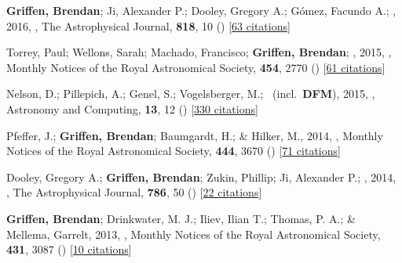 \item[{\color{numcolor}\scriptsize8}] \textbf{Griffen, Brendan}; Ji, Alexander P.; Dooley, Gregory A.; G{\'o}mez, Facundo A.; \etal, 2016, , The Astrophysical Journal, \textbf{818}, 10 () [\href{https://ui.adsabs.harvard.edu/abs/2016ApJ...818...10G}{63 citations}]

\item[{\color{numcolor}\scriptsize7}] Torrey, Paul; Wellons, Sarah; Machado, Francisco; \textbf{Griffen, Brendan}; \etal, 2015, , Monthly Notices of the Royal Astronomical Society, \textbf{454}, 2770 () [\href{https://ui.adsabs.harvard.edu/abs/2015MNRAS.454.2770T}{61 citations}]

\item[{\color{numcolor}\scriptsize6}] Nelson, D.; Pillepich, A.; Genel, S.; Vogelsberger, M.; \etal\ (incl.\ \textbf{DFM}), 2015, , Astronomy and Computing, \textbf{13}, 12 () [\href{https://ui.adsabs.harvard.edu/abs/2015A&C....13...12N}{330 citations}]

\item[{\color{numcolor}\scriptsize5}] Pfeffer, J.; \textbf{Griffen, Brendan}; Baumgardt, H.; \& Hilker, M., 2014, , Monthly Notices of the Royal Astronomical Society, \textbf{444}, 3670 () [\href{https://ui.adsabs.harvard.edu/abs/2014MNRAS.444.3670P}{71 citations}]

\item[{\color{numcolor}\scriptsize4}] Dooley, Gregory A.; \textbf{Griffen, Brendan}; Zukin, Phillip; Ji, Alexander P.; \etal, 2014, , The Astrophysical Journal, \textbf{786}, 50 () [\href{https://ui.adsabs.harvard.edu/abs/2014ApJ...786...50D}{22 citations}]

\item[{\color{numcolor}\scriptsize3}] \textbf{Griffen, Brendan}; Drinkwater, M. J.; Iliev, Ilian T.; Thomas, P. A.; \& Mellema, Garrelt, 2013, , Monthly Notices of the Royal Astronomical Society, \textbf{431}, 3087 () [\href{https://ui.adsabs.harvard.edu/abs/2013MNRAS.431.3087G}{10 citations}]

